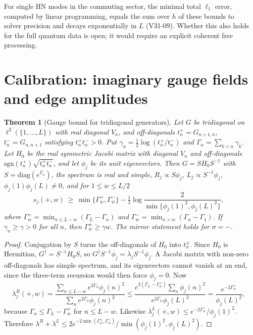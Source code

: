 \documentclass[11pt]{article}
\newtheorem{theorem}{Theorem}
\theoremstyle{definition}
\theoremstyle{remark}
\begin{document}
For single HN modes in the commuting sector, the minimal total $\ell_1$ error, computed by linear programming, equals the sum over $h$ of these bounds to solver precision and decays exponentially in $L$ (V31-09). Whether this also holds for the full quantum data is open; it would require an explicit coherent free processing.

\section{Calibration: imaginary gauge fields and edge amplitudes}
\label{sec:calib}

\begin{theorem}[Gauge bound for tridiagonal generators]\label{thm:gauge}
Let $G$ be tridiagonal on $\ell^2(\{1,\dots,L\})$ with real diagonal $V_n$, and off-diagonals $t^+_n=G_{n+1,n}$, $t^-_n=G_{n,n+1}$ satisfying $t^+_nt^-_n>0$. Put $\gamma_n=\frac12\log(t^+_n/t^-_n)$ and $\Gamma_n=\sum_{k<n}\gamma_k$. Let $H_0$ be the real symmetric Jacobi matrix with diagonal $V_n$ and off-diagonals $\mathrm{sgn}(t^+_n)\sqrt{t^+_nt^-_n}$, and let $\phi_j$ be its unit eigenvectors. Then $G=SH_0S^{-1}$ with $S=\mathrm{diag}(e^{\Gamma_n})$, the spectrum is real and simple, $R_j\propto S\phi_j$, $L_j\propto S^{-1}\phi_j$, $\phi_j(1)\phi_j(L)\ne0$, and for $1\le w\le L/2$
\[
s_j(+,w)\ \ge\ \min\{\Gamma^+_w,\Gamma^-_w\}-\tfrac12\log\frac{2}{\min\{\phi_j(1)^2,\phi_j(L)^2\}},
\]
where $\Gamma^+_w=\min_{n\le L-w}(\Gamma_L-\Gamma_n)$ and $\Gamma^-_w=\min_{n>w}(\Gamma_n-\Gamma_1)$.
If $\gamma_n\ge\gamma>0$ for all $n$, then $\Gamma^\pm_w\ge\gamma w$. The mirror statement holds for $\sigma=-$.
\end{theorem}
\begin{proof}
Conjugation by $S$ turns the off-diagonals of $H_0$ into $t^\pm_n$. Since $H_0$ is Hermitian, $G^\dagger=S^{-1}H_0S$, so $G^\dagger S^{-1}\phi_j=\lambda_jS^{-1}\phi_j$. A Jacobi matrix with non-zero off-diagonals has simple spectrum, and its eigenvectors cannot vanish at an end, since the three-term recursion would then force $\phi_j=0$. Now
\[
\lambda^R_j(+,w)=\frac{\sum_{n\le L-w}e^{2\Gamma_n}\phi_j(n)^2}{\sum_ne^{2\Gamma_n}\phi_j(n)^2}\le\frac{e^{2(\Gamma_L-\Gamma^+_w)}\sum_n\phi_j(n)^2}{e^{2\Gamma_L}\phi_j(L)^2}=\frac{e^{-2\Gamma^+_w}}{\phi_j(L)^2},
\]
because $\Gamma_n\le\Gamma_L-\Gamma^+_w$ for $n\le L-w$. Likewise $\lambda^L_j(+,w)\le e^{-2\Gamma^-_w}/\phi_j(1)^2$. Therefore $\lambda^R+\lambda^L\le2e^{-2\min(\Gamma^+_w,\Gamma^-_w)}/\min(\phi_j(1)^2,\phi_j(L)^2)$.
\end{proof}
\end{document}
